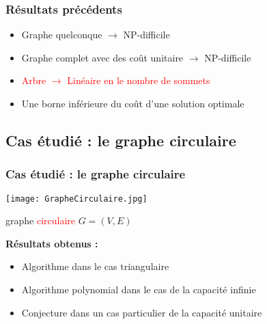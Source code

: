 \begin{frame}[label=PreviousResults]
  \frametitle{Résultats précédents}
  
  \begin{itemize}
  \item Graphe quelconque $\longrightarrow$ NP-difficile
  \item Graphe complet avec des coût unitaire $\longrightarrow$ NP-difficile
  \item \textcolor{red}{Arbre $\longrightarrow$ Linéaire en le nombre de sommets}
  \item Une borne inférieure du coût d'une solution optimale
  \end{itemize}

\end{frame}

\subsection{Cas étudié : le graphe circulaire}

\begin{frame}[label=GrapheCirculaire]
  \frametitle{Cas étudié : le graphe circulaire}
  
  \begin{center}
  
    \begin{minipage}[c]{.5\linewidth}
      \begin{center}
        \texttt{[image: GrapheCirculaire.jpg]}
        
        graphe \textcolor{red}{circulaire} $G=(V,E)$
      \end{center}
    \end{minipage}\hfill
    \begin{minipage}[c]{.5\linewidth}
      \textbf{Résultats obtenus :}
      \begin{itemize}
      \item Algorithme dans le cas triangulaire
      \item Algorithme polynomial dans le cas de la capacité infinie
      \item Conjecture dans un cas particulier de la capacité unitaire
      \end{itemize}
    \end{minipage}
    
  \end{center}

\end{frame}


